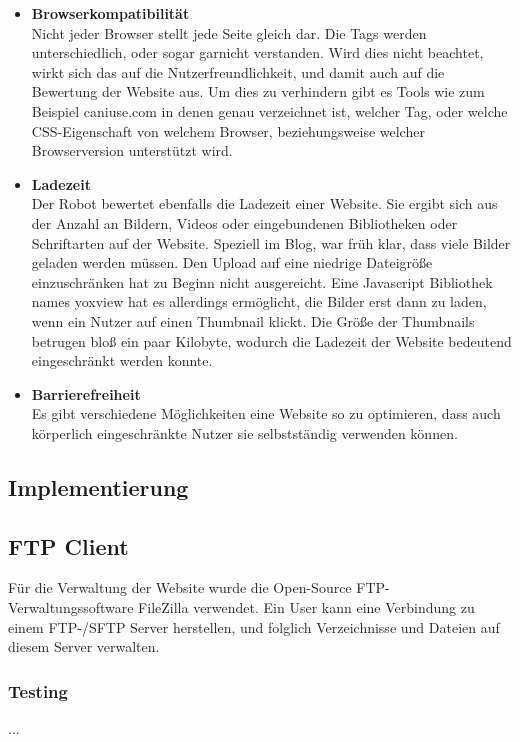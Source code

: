 {\begin{itemize}
      \item \textbf{Browserkompatibilität}\\
        Nicht jeder Browser stellt jede Seite gleich dar. Die Tags werden unterschiedlich, oder sogar garnicht verstanden. Wird dies nicht beachtet, wirkt sich das auf die Nutzerfreundlichkeit,
        und damit auch auf die Bewertung der Website aus. Um dies zu verhindern gibt es Tools wie zum Beispiel caniuse.com in denen genau verzeichnet ist, welcher Tag, oder welche CSS-Eigenschaft
        von welchem Browser, beziehungsweise welcher Browserversion unterstützt wird.

      \item \textbf{Ladezeit}\\
        Der Robot bewertet ebenfalls die Ladezeit einer Website. Sie ergibt sich aus der Anzahl an Bildern, Videos oder eingebundenen Bibliotheken oder Schriftarten auf der Website.
        Speziell im Blog, war früh klar, dass viele Bilder geladen werden müssen. Den Upload auf eine niedrige Dateigröße einzuschränken hat zu Beginn nicht ausgereicht.
        Eine Javascript Bibliothek names yoxview hat es allerdings ermöglicht, die Bilder erst dann zu laden, wenn ein Nutzer auf einen Thumbnail klickt. Die Größe der Thumbnails betrugen bloß
        ein paar Kilobyte, wodurch die Ladezeit der Website bedeutend eingeschränkt werden konnte.

      \item \textbf{Barrierefreiheit}\\
        Es gibt verschiedene Möglichkeiten eine Website so zu optimieren, dass auch körperlich eingeschränkte Nutzer sie selbstständig verwenden können.
    \end{itemize}

  \subsection{Implementierung}

    \subsection{FTP Client}
    Für die Verwaltung der Website wurde die Open-Source FTP-Verwaltungssoftware FileZilla verwendet. Ein User kann eine Verbindung zu einem FTP-/SFTP
    Server herstellen, und folglich Verzeichnisse und Dateien auf diesem Server verwalten.

    \subsubsection{Testing}
    ...

}

